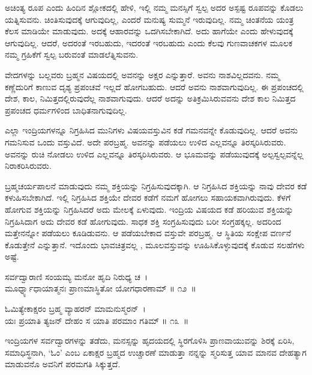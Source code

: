 ಅಚಿಂತ್ಯ ರೂಪ ಎಂದು ಹಿಂದಿನ ಶ್ಲೋಕದಲ್ಲಿ ಹೇಳಿ, ಇಲ್ಲಿ ನಮ್ಮ ಮನಸ್ಸಿಗೆ ಸ್ವಲ್ಪ ಅದರ ಅಸ್ಪಷ್ಟ ರೂಪವನ್ನು ಕೊಡಲು ಯತ್ನಿಸುವನು. ಚಿಂತಿಸುವುದಕ್ಕೆ ಆಗುವುದಿಲ್ಲ, ಎಂದರೆ ಮನುಷ್ಯ ಸುಮ್ಮನೆ ಇರುವುದಿಲ್ಲ. ನಮ್ಮ ಚಿಂತನೆಯ ಯಂತ್ರ ಕೆಲಸ ಮಾಡಿಯೇ ಮಾಡುವುದು. ಅದಕ್ಕೆ ಆಹಾರವನ್ನು ಒದಗಿಸಬೇಕಾಗಿದೆ. ಅದು ಹಾಗೆಯೇ ಎಂದು ಹೇಳುವುದಕ್ಕೆ ಆಗುವುದಿಲ್ಲ. ಆದರೆ, ಅದರಂತೆ ಇರಬಹುದು, ಇದರಂತೆ ಇರಬಹುದು ಎಂದು ಕೆಲವು ಗುಣವಾಚಕಗಳ ಮೂಲಕ ನಮ್ಮ ಗ್ರಹಿಕೆಗೆ ಸ್ವಲ್ಪ ಬರುವಂತೆ ಮಾಡಲೆತ್ನಿಸುವನು.

ವೇದಗಳನ್ನು ಬಲ್ಲವರು ಬ್ರಹ್ಮನ ವಿಷಯದಲ್ಲಿ ಅವನನ್ನು ಅಕ್ಷರ ಎನ್ನುತ್ತಾರೆ. ಅವನು ನಾಶವಿಲ್ಲದವನು. ನಮ್ಮ ಕಣ್ಣೆದುರಿಗೆ ಕಾಣುವ ದೃಶ್ಯ ಪ್ರಪಂಚವೆ ಇಲ್ಲದೆ ಹೋಗಬಹುದು. ಆದರೆ ಅವನು ನಾಶವಾಗುವುದಿಲ್ಲ. ಈ ಪ್ರಪಂಚದಲ್ಲಿ ದೇಶ, ಕಾಲ, ನಿಮಿತ್ತದಲ್ಲಿರುವುದೆಲ್ಲ ನಾಶವಾಗುವುದು. ಆದರೆ ಅದನ್ನು ಅತಿಕ್ರಮಿಸಿರುವವನು ದೇಶ ಕಾಲ ನಿಮಿತ್ತದ ಪ್ರಪಂಚದ ಧರ್ಮಗಳಿಂದ ಬಾಧಿತನಾಗುವುದಿಲ್ಲ.

ಎಲ್ಲಾ ಇಂದ್ರಿಯಗಳನ್ನೂ ನಿಗ್ರಹಿಸಿದ ಮುನಿಗಳು ವಿಷಯವಸ್ತುವಿನ ಕಡೆ ಗಮನವನ್ನೇ ಕೊಡುವುದಿಲ್ಲ. ಆದರೆ ಅವನು ಗಮನಿಸುವ ಒಂದು ವಸ್ತುವಿದೆ. ಅದೇ ಪರಬ್ರಹ್ಮ. ಅವನನ್ನು ಪಡೆಯಲು ಉಳಿದ ಎಲ್ಲವನ್ನೂ ತಿರಸ್ಕರಿಸಿರುವರು. ಅವನನ್ನು ರುಚಿ ನೋಡಲು ಉಳಿದ ಎಲ್ಲವನ್ನೂ ತಿರಸ್ಕರಿಸಿರುವರು. ಆ ಭೂಮವನ್ನು ಪಡೆಯುವುದಕ್ಕೆ ಅಲ್ಪಸ್ವಲ್ಪವನ್ನೆಲ್ಲ ನಿರಾಕರಿಸಿರುವರು.

ಬ್ರಹ್ಮಚರ್ಯಪಾಲನೆ ಮಾಡುವುದು ನಮ್ಮ ಶಕ್ತಿಯನ್ನು ನಿಗ್ರಹಿಸುವುದಕ್ಕಾಗಿ. ಆ ನಿಗ್ರಹಿಸಿದ ಶಕ್ತಿಯನ್ನು ನಾವು ದೇವರ ಕಡೆ ಕಳುಹಿಸಬೇಕಾಗಿದೆ. ಇಲ್ಲಿ ನಿಗ್ರಹಿಸಿದ ಶಕ್ತಿಯೇ ದೇವರ ಕಡೆಗೆ ನಮಗೆ ಹೋಗಲು ಸಹಾಯಕವಾಗಿರುವುದು. ಕೆಳಗೆ ಹೋಗುವ ಶಕ್ತಿಯನ್ನು ನಿಗ್ರಹಿಸಿದರೆ ಅದು ಮೇಲಕ್ಕೆ ಏಳುವುದು. ಇಂದ್ರಿಯ ವಿಷಯದ ಕಡೆ ಹರಿಯುವ ಶಕ್ತಿಯನ್ನು ನಿಗ್ರಹಿಸಿದಾಗ ಅದು ದೇವರ ಕಡೆ ಹೋಗುವುದು. ಸಾಧಕ ಶಕ್ತಿ ಸಂಗ್ರಹಿಸುವುದು ಬರೀ ಸಂಗ್ರಹಕ್ಕಲ್ಲ. ಅದರಿಂದ ಮತ್ತೇನನ್ನೋ ಪಡೆಯಲು ಕೂಡಿಡುವನು. ಆ ಪಡೆಯಬೇಕಾದ ವಸ್ತುವೇ ಪರಬ್ರಹ್ಮ. ಆ ಸ್ಥಿತಿಯ ಸಂಕ್ಷೇಪ ವರ್ಣನೆ ಕೊಡುತ್ತೇನೆ ಎನ್ನುತ್ತಾನೆ. ಇದೊಂದು ಭಾವಚಿತ್ರವಲ್ಲ , ಮೂಲವಸ್ತುವನ್ನು ಊಹಿಸಿಕೊಳ್ಳುವುದಕ್ಕೆ ಕೊಡುವ ಸಲಹೆಗಳು ಅಷ್ಟೆ.

\begin{shloka}
ಸರ್ವದ್ವಾರಾಣಿ ಸಂಯಮ್ಯ ಮನೋ ಹೃದಿ ನಿರುಧ್ಯ ಚ~।\\ಮೂರ್ಧ್ನ್ಯಾಧಾಯಾತ್ಮನಃ ಪ್ರಾಣಮಾಸ್ಥಿತೋ ಯೋಗಧಾರಣಾಮ್ \hfill॥ ೧೨~॥
\end{shloka}

\begin{shloka}
ಓಮಿತ್ಯೇಕಾಕ್ಷರಂ ಬ್ರಹ್ಮ ವ್ಯಾಹರನ್ ಮಾಮನುಸ್ಮರನ್~।\\ಯಃ ಪ್ರಯಾತಿ ತ್ಯಜನ್ ದೇಹಂ ಸ ಯಾತಿ ಪರಮಾಂ ಗತಿಮ್ \hfill॥ ೧೩~॥
\end{shloka}

\begin{artha}
ಇಂದ್ರಿಯಗಳ ಸರ್ವದ್ವಾರಗಳನ್ನು ತಡೆದು, ಮನಸ್ಸನ್ನು ಹೃದಯದಲ್ಲಿ ಸ್ಥಿರಗೊಳಿಸಿ ಪ್ರಾಣವಾಯುವನ್ನು ಶಿರಕ್ಕೆ ಏರಿಸಿ, ಸಮಾಧಿಸ್ಥನಾಗಿ, ‘ಓಂ’ ಎಂಬ ಏಕಾಕ್ಷರ ಬ್ರಹ್ಮದ ಉಚ್ಚಾರಣೆ ಮಾಡುತ್ತಾ ನನ್ನನ್ನು ಸ್ಮರಿಸುತ್ತ ಯಾವ ಮಾನವ ದೇಹತ್ಯಾಗ ಮಾಡುವನೊ ಅವನಿಗೆ ಪರಮಗತಿ ಸಿಕ್ಕುತ್ತದೆ.
\end{artha}

